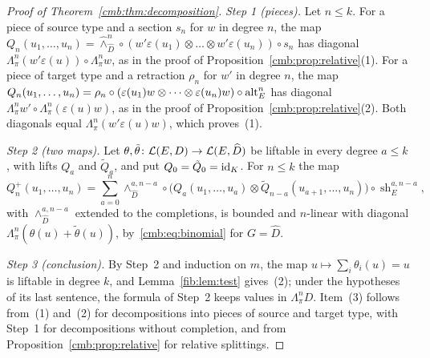 \begin{proof}[Proof of Theorem~\ref{cmb:thm:decomposition}]
\emph{Step 1 (pieces).} Let $n\le k$. For a piece of source type and a section $s_n$ for $w$ in degree $n$, the map
$Q_n(u_1,\dots,u_n)=\widehat\wedge^n_{\widehat D}\circ(w'\varepsilon(u_1)\otimes\dots\otimes w'\varepsilon(u_n))\circ s_n$
has diagonal $\Lambda^n_\pi(w'\varepsilon(u))\circ\Lambda^n_\pi w$, as in the proof of
Proposition~\ref{cmb:prop:relative}(1). For a piece of target type and a retraction $\rho_n$ for $w'$ in degree $n$, the
map $Q_n(u_1,\dots,u_n)=\rho_n\circ(\varepsilon(u_1)w\otimes\dots\otimes\varepsilon(u_n)w)\circ\operatorname{alt}^n_E$ has diagonal
$\Lambda^n_\pi w'\circ\Lambda^n_\pi(\varepsilon(u)w)$, as in the proof of Proposition~\ref{cmb:prop:relative}(2). Both
diagonals equal $\Lambda^n_\pi(w'\varepsilon(u)w)$, which proves~(1).

\emph{Step 2 (two maps).} Let $\theta,\tilde\theta\colon\mathcal L(E,D)\to\mathcal L(E,\widehat D)$ be liftable in every degree
$a\le k$, with lifts $Q_a$ and $\tilde Q_a$, and put $Q_0=\tilde Q_0=\mathrm{id}_K$. For $n\le k$ the map
\[
 Q^+_n(u_1,\dots,u_n)=\sum_{a=0}^n\wedge^{a,n-a}_{\widehat D}\circ\bigl(Q_a(u_1,\dots,u_a)\otimes
 \tilde Q_{n-a}(u_{a+1},\dots,u_n)\bigr)\circ\operatorname{sh}^{a,n-a}_E ,
\]
with $\wedge^{a,n-a}_{\widehat D}$ extended to the completions, is bounded and $n$-linear with diagonal
$\Lambda^n_\pi(\theta(u)+\tilde\theta(u))$, by~\eqref{cmb:eq:binomial} for $G=\widehat D$.

\emph{Step 3 (conclusion).} By Step~2 and induction on $m$, the map $u\mapsto\sum_i\theta_i(u)=u$ is liftable in degree
$k$, and Lemma~\ref{fib:lem:test} gives~(2); under the hypotheses of its last sentence, the formula of Step~2 keeps values
in $\Lambda^n_\pi D$. Item~(3) follows from~(1) and~(2) for decompositions into pieces of source and target type, with
Step~1 for decompositions without completion, and from Proposition~\ref{cmb:prop:relative} for relative splittings.
\end{proof}

